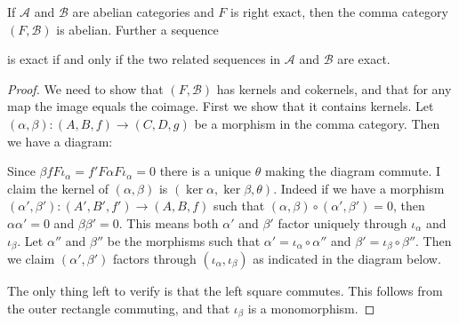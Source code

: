 \begin{prop}\label{prop:comma-cat_abelian}
	If $\mathcal A$ and $\mathcal B$ are abelian categories and $F$ is right exact, then the comma category $(F, \mathcal  B)$ is abelian. Further a sequence
	\begin{center}
	\end{center}
	is exact if and only if the two related sequences in $\mathcal A$ and $\mathcal B$ are exact.
	\begin{center}
	\end{center}
	\begin{proof}
		We need to show that $(F, \mathcal B)$ has kernels and cokernels, and that for any map the image equals the coimage. First we show that it contains kernels. Let $(\alpha, \beta)\colon(A, B, f) \to (C, D, g)$ be a morphism in the comma category. Then we have a diagram:
		\begin{center}
		\end{center}
		Since $\beta f F\iota_\alpha = f' F\alpha F \iota_\alpha = 0$ there is a unique $\theta$ making the diagram commute. I claim the kernel of $(\alpha, \beta)$ is $(\ker \alpha, \ker \beta, \theta)$. Indeed if we have a morphism $(\alpha', \beta')\colon (A', B', f') \to (A, B, f)$ such that $(\alpha, \beta) \circ (\alpha', \beta') = 0$, then $\alpha\alpha'=0$ and $\beta\beta'=0$. This means both $\alpha'$ and $\beta'$ factor uniquely through $\iota_\alpha$ and $\iota_\beta$. Let $\alpha''$ and $\beta''$ be the morphisms such that $\alpha' = \iota_\alpha \circ \alpha''$ and $\beta' = \iota_\beta \circ \beta''$. Then we claim $(\alpha', \beta')$ factors through $(\iota_\alpha, \iota_\beta)$ as indicated in the diagram below.
		\begin{center}
		\end{center}
		The only thing left to verify is that the left square commutes. This follows from the outer rectangle commuting, and that $\iota_\beta$ is a monomorphism.
		

\end{proof}
\end{prop}
